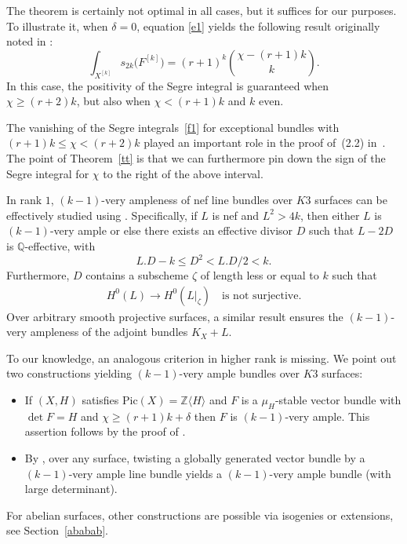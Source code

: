 \documentclass[10pt,a4paper]{amsart}
\numberwithin{equation}{section}
\begin{document}
\begin{Remark}%
The theorem is certainly not optimal in all cases, but it suffices for our purposes. To illustrate it, when $\delta=0$, equation \eqref{e1} yields the following result originally noted in \cite[Proposition 2.1]{MOP}:
\begin{equation}\label{f1}
\int_{X^{[k]}} s_{2k}\big(F^{[k]}\big)=(r+1)^k \binom{\chi-(r+1)k}{k}.
\end{equation}
In this case, the positivity of the Segre integral is guaranteed when $\chi\geq (r+2)k$, but also when $\chi<(r+1)k$ and $k$ even.

The vanishing of the Segre integrals~\eqref{f1} for exceptional bundles with $(r+1)k\leq \chi<(r+2)k$ played an important role in the proof of~(2.2) in~\cite{MOP}. The point of Theorem~\ref{tt} is that we can furthermore pin down the sign of the Segre integral for $\chi$ to the right of the above interval.
\end{Remark}

\begin{Remark}\label{remk}
In rank $1$, $(k-1)$-very ampleness of nef line bundles over $K3$ surfaces can be effectively studied using \cite[Theorem~2.1]{BS}. Specifically, if
$L$ is nef and $L^2>4k$, then either $L$ is $(k-1)$-very ample or else there exists an effective divisor $D$ such that $L-2D$ is $\mathbb Q$-effective, with
\begin{equation}\label{kva}
L.D-k\leq D^2<L.D/2<k.
\end{equation}
Furthermore, $D$ contains a subscheme $\zeta$ of length less or equal to $k$ such that
\begin{gather*}
H^0(L)\to H^0(L|_{\zeta})\quad\text{is not surjective.}
\end{gather*}
Over arbitrary smooth projective surfaces, a similar result ensures the $(k-1)$-very ampleness of the adjoint bundles $K_X+L$.

To our knowledge, an analogous criterion in higher rank is missing. We point out two constructions yielding $(k-1)$-very ample bundles over $K3$ surfaces:
\begin{itemize}\itemsep=0pt
\item [$(i)$] If $(X, H)$ satisfies $\text{Pic} (X)=\mathbb Z\langle H\rangle$ and $F$ is a $\mu_H$-stable vector bundle with $\det F=H$ and $\chi\geq (r+1)k+\delta$ then $F$ is $(k-1)$-very ample. This assertion follows by the proof of \cite[Proposition 2.2]{MOP}.
\item [$(ii)$] By \cite[Proposition 4.5]{BBF}, over any surface, twisting a globally generated vector bundle by a~$(k-1)$-very ample line bundle yields a $(k-1)$-very ample bundle (with large determinant).
\end{itemize}
For abelian surfaces, other constructions are possible via isogenies or extensions, see Section~\ref{ababab}.
\end{Remark}
\end{document}

